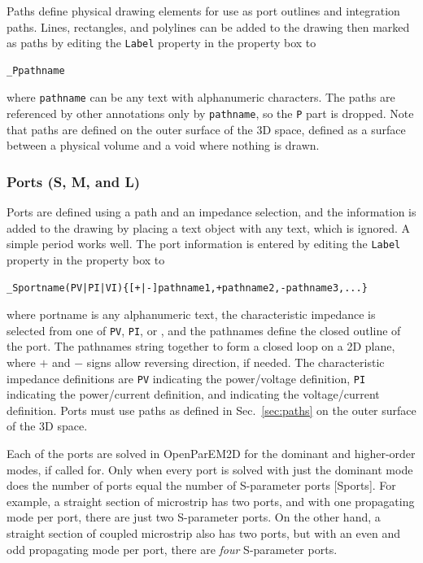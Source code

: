 \documentclass[titlepage]{article}
\renewcommand\_{\textunderscore\linebreak[1]}
\begin{document}
Paths define physical drawing elements for use as port outlines and integration paths.  Lines, rectangles, and polylines can be added to the drawing then marked as paths by editing the \texttt{Label} property in the property box to
\begin{Verbatim}[fontsize=\small]
  _Ppathname
\end{Verbatim}
\noindent where \texttt{pathname} can be any text with alphanumeric characters.  The paths are referenced by other annotations only by \texttt{pathname}, so the \texttt{\_P} part is dropped.  Note that paths are defined on the outer surface of the 3D space, defined as a surface between a physical volume and a void where nothing is drawn.

\subsubsection{Ports (\_S, \_M, and \_L)}
\label{sec:ports}

Ports are defined using a path and an impedance selection, and the information is added to the drawing by placing a text object with any text, which is ignored.  A simple period works well.  The port information is entered by editing the \texttt{Label} property in the property box to
\begin{Verbatim}[fontsize=\small]
  _Sportname(PV|PI|VI){[+|-]pathname1,+pathname2,-pathname3,...}
\end{Verbatim}
\noindent where portname is any alphanumeric text, the characteristic impedance is selected from one of \texttt{PV}, \texttt{PI}, or , and the pathnames define the closed outline of the port.  The pathnames string together to form a closed loop on a 2D plane, where $+$ and $-$ signs allow reversing direction, if needed.  The characteristic impedance definitions are \texttt{PV} indicating the power/voltage definition, \texttt{PI} indicating the power/current definition, and  indicating the voltage/current definition.  Ports must use paths as defined in Sec.~\ref{sec:paths} on the outer surface of the 3D space.

Each of the ports are solved in OpenParEM2D for the dominant and higher-order modes, if called for.  Only when every port is solved with just the dominant mode does the number of ports equal the number of S-parameter ports [Sports].  For example, a straight section of microstrip has two ports, and with one propagating mode per port, there are just two S-parameter ports.  On the other hand, a straight section of coupled microstrip also has two ports, but with an even and odd propagating mode per port, there are \textit{four} S-parameter ports.
\end{document}
